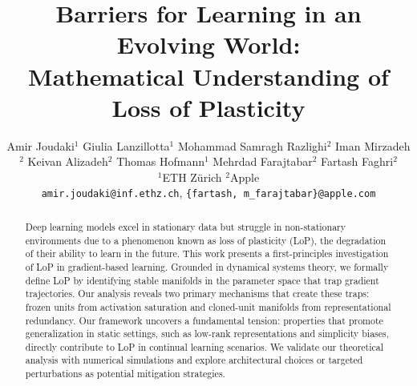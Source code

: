 \documentclass{article}
\title{Barriers for Learning in an Evolving World: \\Mathematical Understanding of Loss of Plasticity}
\author{%
  Amir Joudaki$^{1}$ \And
  Giulia Lanzillotta$^{1}$ \And
  Mohammad Samragh Razlighi$^{2}$ \And
  Iman Mirzadeh$^{2}$ \And
  Keivan Alizadeh$^{2}$ \And
  Thomas Hofmann$^{1}$ \And
  Mehrdad Farajtabar$^{2}$ \And
  Fartash Faghri$^{2}$ %
  \\
  $^{1}$ETH Zürich \quad
  $^{2}$Apple \\
  \texttt{amir.joudaki@inf.ethz.ch},
  \texttt{\{fartash, m\_farajtabar\}@apple.com}
}
\numberwithin{figure}{section}
\begin{document}
\maketitle
\begin{abstract}

Deep learning models excel in stationary data but struggle in non-stationary environments due to a phenomenon known as loss of plasticity (LoP), the degradation of their ability to learn in the future. This work presents a first-principles investigation of LoP in gradient-based learning. Grounded in dynamical systems theory, we formally define LoP by identifying stable manifolds in the parameter space that trap gradient trajectories. Our analysis reveals two primary mechanisms that create these traps: frozen units from activation saturation and cloned-unit manifolds from representational redundancy. Our framework uncovers a fundamental tension: properties that promote generalization in static settings, such as low-rank representations and simplicity biases, directly contribute to LoP in continual learning scenarios. We validate our theoretical analysis with numerical simulations and explore architectural choices or targeted perturbations as potential mitigation strategies.





\end{abstract}
\end{document}
